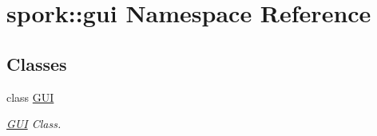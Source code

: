 \hypertarget{namespacespork_1_1gui}{}\section{spork\+:\+:gui Namespace Reference}
\label{namespacespork_1_1gui}
\subsection*{Classes}
\begin{DoxyCompactItemize}
\item 
class \hyperlink{classspork_1_1gui_1_1_g_u_i}{G\+UI}
\begin{DoxyCompactList}\small\item\em \hyperlink{classspork_1_1gui_1_1_g_u_i}{G\+UI} Class. \end{DoxyCompactList}\end{DoxyCompactItemize}
